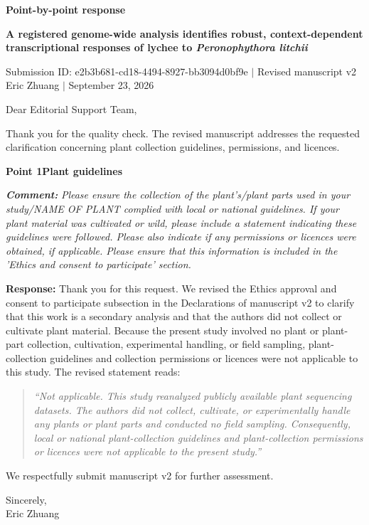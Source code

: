 \documentclass[10pt]{article}
\begin{document}
\RaggedRight
{\fontsize{27}{31}\selectfont\bfseries\color{headingtext} Point-by-point response}\par
\vspace{4pt}
{\fontsize{11}{14}\selectfont\bfseries\color{headingtext} A registered genome-wide analysis identifies robust, context-dependent transcriptional responses of lychee to \textit{Peronophythora litchii}}\par
\vspace{4pt}
{\fontsize{9.5}{12}\selectfont\color{graytext} Submission ID: e2b3b681-cd18-4494-8927-bb3094d0bf9e $\mid$ Revised manuscript v2\\
Eric Zhuang $\mid$ September 23, 2026}\par
\vspace{7pt}
Dear Editorial Support Team,\par
Thank you for the quality check. The revised manuscript addresses the requested clarification concerning plant collection guidelines, permissions, and licences.\par
\vspace{5pt}
{\fontsize{14}{17}\selectfont\bfseries\color{headingtext} Point 1\quad Plant guidelines}\par
\vspace{1pt}
\textbf{\textit{Comment:}} \textit{Please ensure the collection of the plant's/plant parts used in your study/NAME OF PLANT complied with local or national guidelines. If your plant material was cultivated or wild, please include a statement indicating these guidelines were followed. Please also indicate if any permissions or licences were obtained, if applicable. Please ensure that this information is included in the 'Ethics and consent to participate' section.}\par
\vspace{2pt}
\textbf{Response:} Thank you for this request. We revised the Ethics approval and consent to participate subsection in the Declarations of manuscript v2 to clarify that this work is a secondary analysis and that the authors did not collect or cultivate plant material. Because the present study involved no plant or plant-part collection, cultivation, experimental handling, or field sampling, plant-collection guidelines and collection permissions or licences were not applicable to this study. The revised statement reads:\par
\vspace{2pt}
\begin{quote}
\itshape{} ``Not applicable. This study reanalyzed publicly available plant sequencing datasets. The authors did not collect, cultivate, or experimentally handle any plants or plant parts and conducted no field sampling. Consequently, local or national plant-collection guidelines and plant-collection permissions or licences were not applicable to the present study.''
\end{quote}
\vspace{1pt}
We respectfully submit manuscript v2 for further assessment.\par
\vspace{7pt}
Sincerely,\\
Eric Zhuang
\end{document}
